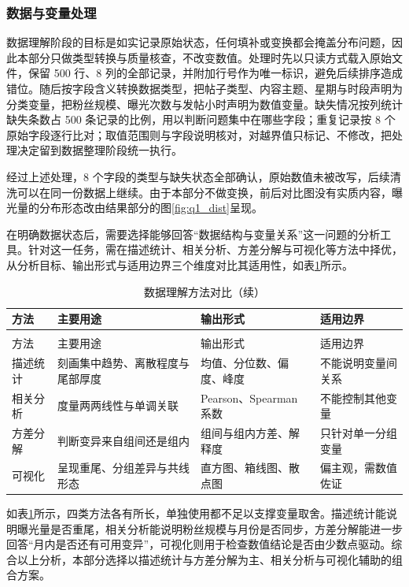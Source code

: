 \subsubsection{数据与变量处理}

数据理解阶段的目标是如实记录原始状态，任何填补或变换都会掩盖分布问题，因此本部分只做类型转换与质量核查，不改变数值。处理时先以只读方式载入原始文件，保留 500 行、8 列的全部记录，并附加行号作为唯一标识，避免后续排序造成错位。随后按字段含义转换数据类型，把帖子类型、内容主题、星期与时段声明为分类变量，把粉丝规模、曝光次数与发帖小时声明为数值变量。缺失情况按列统计缺失条数占 500 条记录的比例，用以判断问题集中在哪些字段；重复记录按 8 个原始字段逐行比对；取值范围则与字段说明核对，对越界值只标记、不修改，把处理决定留到数据整理阶段统一执行。

经过上述处理，8 个字段的类型与缺失状态全部确认，原始数值未被改写，后续清洗可以在同一份数据上继续。由于本部分不做变换，前后对比图没有实质内容，曝光量的分布形态改由结果部分的图\ref{fig:q1_dist}呈现。

在明确数据状态后，需要选择能够回答“数据结构与变量关系”这一问题的分析工具。针对这一任务，需在描述统计、相关分析、方差分解与可视化等方法中择优，从分析目标、输出形式与适用边界三个维度对比其适用性，如表\ref{tab:algo1}所示。

\begin{longtable}{>{\centering\arraybackslash}p{}>{\centering\arraybackslash}p{}>{\centering\arraybackslash}p{}>{\centering\arraybackslash}p{}}
  \caption{数据理解方法对比}
  \label{tab:algo1} \\
  \toprule
  方法 & 主要用途 & 输出形式 & 适用边界 \\
  \midrule
  \endfirsthead
  \caption{数据理解方法对比（续）} \\
  \toprule
  方法 & 主要用途 & 输出形式 & 适用边界 \\
  \midrule
  \endhead
  \bottomrule
  \endfoot
  描述统计 & 刻画集中趋势、离散程度与尾部厚度 & 均值、分位数、偏度、峰度 & 不能说明变量间关系 \\
  相关分析 & 度量两两线性与单调关联 & Pearson、Spearman 系数 & 不能控制其他变量 \\
  方差分解 & 判断变异来自组间还是组内 & 组间与组内方差、解释度 & 只针对单一分组变量 \\
  可视化 & 呈现重尾、分组差异与共线形态 & 直方图、箱线图、散点图 & 偏主观，需数值佐证 \\
\end{longtable}

如表\ref{tab:algo1}所示，四类方法各有所长，单独使用都不足以支撑变量取舍。描述统计能说明曝光量是否重尾，相关分析能说明粉丝规模与月份是否同步，方差分解能进一步回答“月内是否还有可用变异”，可视化则用于检查数值结论是否由少数点驱动。综合以上分析，本部分选择以描述统计与方差分解为主、相关分析与可视化辅助的组合方案。

